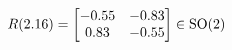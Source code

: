 \documentclass[preview]{standalone}
\begin{document}
\begin{align*}
\special{dvisvgm:raw <g id='unique000'>}R(2.16) = \begin{bmatrix} -0.55 & -0.83 \\ 0.83 & -0.55 \end{bmatrix} \in \text{SO}(2)\special{dvisvgm:raw </g>}
\end{align*}
\end{document}
